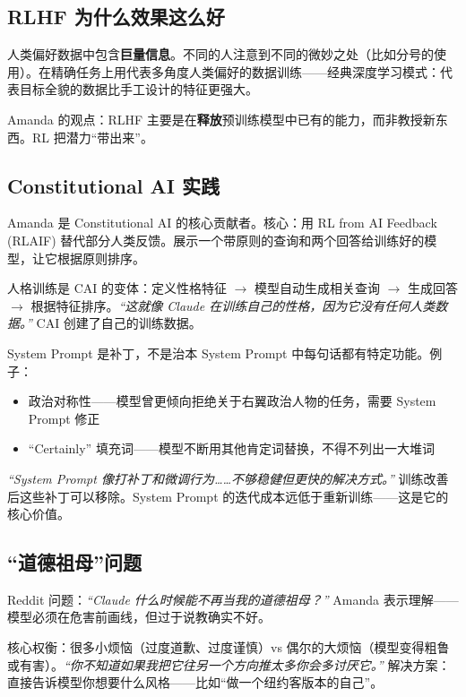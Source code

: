 \documentclass[a4paper]{article}
\begin{document}
\subsection{RLHF 为什么效果这么好}

人类偏好数据中包含\textbf{巨量信息}。不同的人注意到不同的微妙之处（比如分号的使用）。在精确任务上用代表多角度人类偏好的数据训练——经典深度学习模式：代表目标全貌的数据比手工设计的特征更强大。

Amanda 的观点：RLHF 主要是在\textbf{释放}预训练模型中已有的能力，而非教授新东西。RL 把潜力``带出来''。

\subsection{Constitutional AI 实践}

Amanda 是 Constitutional AI 的核心贡献者。核心：用 RL from AI Feedback (RLAIF) 替代部分人类反馈。展示一个带原则的查询和两个回答给训练好的模型，让它根据原则排序。

人格训练是 CAI 的变体：定义性格特征 $\to$ 模型自动生成相关查询 $\to$ 生成回答 $\to$ 根据特征排序。\textit{``这就像 Claude 在训练自己的性格，因为它没有任何人类数据。''} CAI 创建了自己的训练数据。

\begin{warningbox}{System Prompt 是补丁，不是治本}
System Prompt 中每句话都有特定功能。例子：
\begin{itemize}
    \item 政治对称性——模型曾更倾向拒绝关于右翼政治人物的任务，需要 System Prompt 修正
    \item ``Certainly'' 填充词——模型不断用其他肯定词替换，不得不列出一大堆词
\end{itemize}

\textit{``System Prompt 像打补丁和微调行为……不够稳健但更快的解决方式。''} 训练改善后这些补丁可以移除。System Prompt 的迭代成本远低于重新训练——这是它的核心价值。
\end{warningbox}

\subsection{``道德祖母''问题}

Reddit 问题：\textit{``Claude 什么时候能不再当我的道德祖母？''} Amanda 表示理解——模型必须在危害前画线，但过于说教确实不好。

核心权衡：很多小烦恼（过度道歉、过度谨慎）vs 偶尔的大烦恼（模型变得粗鲁或有害）。\textit{``你不知道如果我把它往另一个方向推太多你会多讨厌它。''} 解决方案：直接告诉模型你想要什么风格——比如``做一个纽约客版本的自己''。
\end{document}
